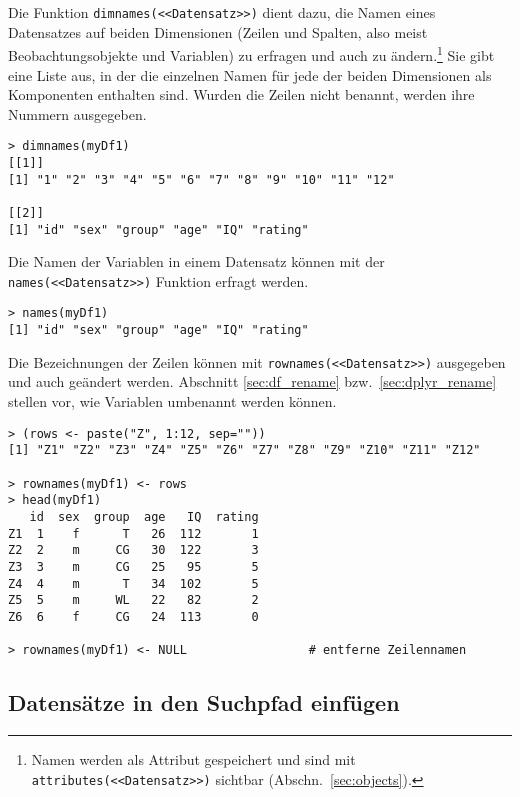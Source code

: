Die Funktion \lstinline!dimnames(<<Datensatz>>)! dient dazu, die Namen eines Datensatzes auf beiden Dimensionen (Zeilen und Spalten, also meist Beobachtungsobjekte und Variablen) zu erfragen und auch zu ändern.\footnote{Namen werden als Attribut gespeichert und sind mit \lstinline!attributes(<<Datensatz>>)! sichtbar (Abschn.\ \ref{sec:objects}).} Sie gibt eine Liste aus, in der die einzelnen Namen für jede der beiden Dimensionen als Komponenten enthalten sind. Wurden die Zeilen nicht benannt, werden ihre Nummern ausgegeben.
\begin{lstlisting}
> dimnames(myDf1)
[[1]]
[1] "1" "2" "3" "4" "5" "6" "7" "8" "9" "10" "11" "12"

[[2]]
[1] "id" "sex" "group" "age" "IQ" "rating"
\end{lstlisting}

Die Namen der Variablen in einem Datensatz können mit der \lstinline!names(<<Datensatz>>)! Funktion erfragt werden.
\begin{lstlisting}
> names(myDf1)
[1] "id" "sex" "group" "age" "IQ" "rating"
\end{lstlisting}

Die Bezeichnungen der Zeilen können mit \lstinline!rownames(<<Datensatz>>)! ausgegeben und auch geändert werden. Abschnitt \ref{sec:df_rename} bzw.\ \ref{sec:dplyr_rename} stellen vor, wie Variablen umbenannt werden können.
\begin{lstlisting}
> (rows <- paste("Z", 1:12, sep=""))
[1] "Z1" "Z2" "Z3" "Z4" "Z5" "Z6" "Z7" "Z8" "Z9" "Z10" "Z11" "Z12"

> rownames(myDf1) <- rows
> head(myDf1)
   id  sex  group  age   IQ  rating
Z1  1    f      T   26  112       1
Z2  2    m     CG   30  122       3
Z3  3    m     CG   25   95       5
Z4  4    m      T   34  102       5
Z5  5    m     WL   22   82       2
Z6  6    f     CG   24  113       0

> rownames(myDf1) <- NULL                 # entferne Zeilennamen
\end{lstlisting}

\subsection{Datensätze in den Suchpfad einfügen}

